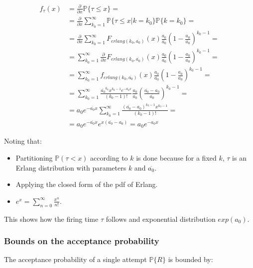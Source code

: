   \begin{align*}
    f_\tau(x) &= \frac{\partial}{\partial x}\mathbb{P}\{\tau\le x\} =\\
              &= \frac{\partial}{\partial x}\sum\limits_{k_0=1}^{\infty}\mathbb{P}\{\tau\le x|k = k_0\}\mathbb{P}\{k=k_0\}=\\
              &=\frac{\partial}{\partial x}\sum\limits_{k_0=1}^{\infty}F_{erlang(k_0,\overline{a_0})}(x)\frac{a_0}{\overline{a_0}}\left(1-\frac{a_0}{\overline{a_0}}\right)^{k_0-1} =\\
              &=\sum\limits_{k_0=1}^{\infty}\frac{\partial}{\partial x}F_{erlang(k_0,\overline{a_0})}(x)\frac{a_0}{\overline{a_0}}\left(1-\frac{a_0}{\overline{a_0}}\right)^{k_0-1} =\\
              &=\sum\limits_{k_0=1}^{\infty}f_{erlang(k_0,\overline{a_0})}(x)\frac{a_0}{\overline{a_0}}\left(1-\frac{a_0}{\overline{a_0}}\right)^{k_0-1} =\\
              &=\sum\limits_{k_0=1}^{\infty}\frac{\overline{a_0}^{k_0}x^{k_0-1}e^{-\overline{a_0}x}}{(k_0-1)!}\frac{a_0}{\overline{a_0}}\left(\frac{\overline{a_0}-a_0}{\overline{a_0}}\right)^{k_0-1} =\\
              &=a_0e^{-\overline{a_0}x}\sum\limits_{k_0=1}^{\infty}\frac{(\overline{a_0}-a_0)^{k_0-1}x^{k_0-1}}{(k_0-1)!}=\\
              &=a_0e^{-\overline{a_0}x}e^{x(\overline{a_0}-a_0)} = a_0e^{-a_0 x}
  \end{align*}

  Noting that:

  \begin{multicols}{2}
    \begin{itemize}
      \item Partitioning $\mathbb{P}(\tau<x)$ according to $k$ is done because for a fixed $k$, $\tau$ is an Erlang distribution with parameters $k$ and $\overline{a_0}$.
      \item Applying the closed form of the pdf of Erlang.
      \item $e^x = \sum\limits_{n=0}^{\infty}\frac{x^n}{n!}$.
    \end{itemize}
  \end{multicols}

  This shows how the firing time $\tau$ follows and exponential distribution $exp(a_0)$.

    \subsubsection{Bounds on the acceptance probability}
    The acceptance probability of a single attempt $\mathbb{P}\{R\}$ is bounded by:

